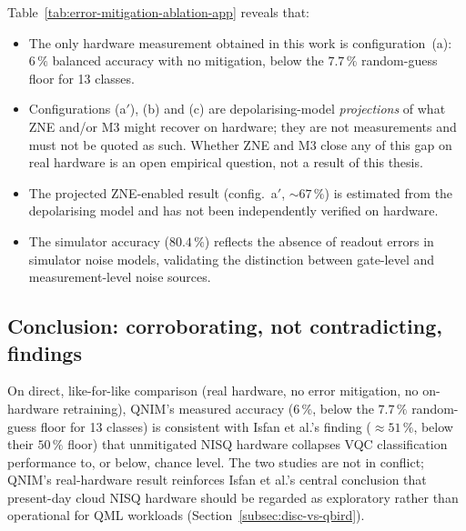 \documentclass[11pt,a4paper, english]{book}
\theoremstyle{plain}
\theoremstyle{definition}
\numberwithin{equation}{chapter}
\numberwithin{figure}{chapter}
\numberwithin{table}{chapter}
\begin{document}
Table~\ref{tab:error-mitigation-ablation-app} reveals that:
\begin{itemize}
  \item The only hardware measurement obtained in this work is
        configuration~(a): $6\,\%$ balanced accuracy with no mitigation,
        below the $7.7\,\%$ random-guess floor for 13 classes.
  \item Configurations (a$'$), (b) and (c) are depolarising-model
        \emph{projections} of what ZNE and/or M3 might recover on hardware;
        they are not measurements and must not be quoted as such.
        Whether ZNE and M3 close any of this gap on real hardware is an
        open empirical question, not a result of this thesis.
  \item The projected ZNE-enabled result (config.~a$'$, ${\sim}67\,\%$)
        is estimated from the depolarising model and has not been
        independently verified on hardware.
  \item The simulator accuracy ($80.4\,\%$) reflects the absence of readout errors
        in simulator noise models, validating the distinction between gate-level
        and measurement-level noise sources.
\end{itemize}

\subsection{Conclusion: corroborating, not contradicting, findings}

On direct, like-for-like comparison (real hardware, no error mitigation, no
on-hardware retraining), QNIM's measured accuracy ($6\,\%$, below the
$7.7\,\%$ random-guess floor for 13 classes) is consistent with Isfan et
al.'s finding ($\approx 51\,\%$, below their $50\,\%$ floor) that unmitigated
NISQ hardware collapses VQC classification performance to, or below, chance
level. The two studies are not in conflict; QNIM's real-hardware result
reinforces Isfan et al.'s central conclusion that present-day cloud NISQ
hardware should be regarded as exploratory rather than operational for QML
workloads (Section~\ref{subsec:disc-vs-qbird}).
\end{document}
